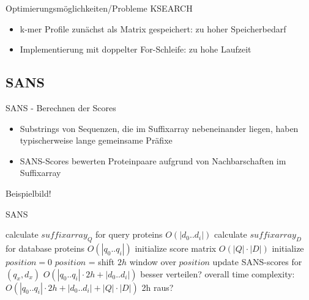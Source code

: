 \documentclass[xcolor=dvipsnames, aspectratio=1610]{beamer}
\begin{document}
\begin{frame}{Optimierungsmöglichkeiten/Probleme KSEARCH}
  \begin{itemize}
    \item k-mer Profile zunächst als Matrix gespeichert: zu hoher Speicherbedarf
    \item Implementierung mit doppelter For-Schleife: zu hohe Laufzeit
  \end{itemize}
\end{frame}

\subsection{SANS}

\begin{frame}{SANS - Berechnen der Scores}
  \begin{itemize}
    \item Substrings von Sequenzen, die im Suffixarray nebeneinander liegen, haben typischerweise lange gemeinsame Präfixe
    \item  SANS-Scores bewerten Proteinpaare aufgrund von Nachbarschaften im Suffixarray
  \end{itemize}
  
  Beispielbild!
\end{frame}

\begin{frame}{SANS}
 \begin{algorithmic}
     \State calculate $suffixarray_Q$ for query proteins \Comment $O(|d_0..d_i|)$
     \State calculate $suffixarray_D$ for database proteins \Comment $O(|q_0..q_i|)$
     \State initialize score matrix \Comment $O(|Q|\cdot|D|)$
     \State initialize $position = 0$
       \State  $position$ =  
       \State shift $2h$ window over $position$ 
         \State update SANS-scores for  $(q_x,d_x)$
       \EndFor
     \EndFor \Comment $O(|q_0..q_i|\cdot2h + |d_0..d_i|)$ besser verteilen?
    \EndFunction  \Comment overall time complexity: $O(|q_0..q_i|\cdot2h + |d_0..d_i|+|Q|\cdot|D|)$ 2h raus?
  \end{algorithmic}
\end{frame}
\end{document}
